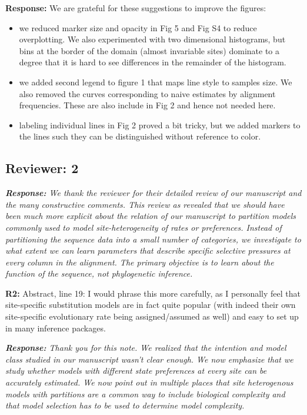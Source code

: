 \documentclass[aps,rmp,onecolumn]{revtex4-1}
\newcommand{\refb}[1]{\textbf{R2:} #1}
\newcommand{\response}[1]{{\it {\color{response}\textbf{Response:} #1}}}
\begin{document}
\response{
We are grateful for these suggestions to improve the figures:
\begin{itemize}
    \item we reduced marker size and opacity in Fig 5 and Fig S4 to reduce overplotting. We also experimented with two dimensional histograms, but bins at the border of the domain (almost invariable sites) dominate to a degree that it is hard to see differences in the remainder of the histogram.
    \item we added second legend to figure 1 that maps line style to samples size. We also removed the curves corresponding to naive estimates by alignment frequencies. These are also include in Fig 2 and hence not needed here.
    \item labeling individual lines in Fig 2 proved a bit tricky, but we added markers to the lines such they can be distinguished without reference to color.
\end{itemize}
}


\subsection*{Reviewer: 2}
\response{
We thank the reviewer for their detailed review of our manuscript and the many constructive comments.
This review as revealed that we should have been much more explicit about the relation of our manuscript to partition models commonly used to model site-heterogeneity of rates or preferences.
Instead of partitioning the sequence data into a small number of categories, we investigate to what extent we can learn parameters that describe specific selective pressures at every column in the alignment.
The primary objective is to learn about the function of the sequence, not phylogenetic inference.
}

\refb{Abstract, line 19: I would phrase this more carefully, as I personally feel that site-specific substitution models are in fact quite popular (with indeed their own site-specific evolutionary rate being assigned/assumed as well) and easy to set up in many inference packages.}

\response{Thank you for this note. We realized that the intention and model class studied in our manuscript wasn't clear enough. We now emphasize that we study whether models with different state preferences at every site can be accurately estimated.
We now point out in multiple places that site heterogenous models with partitions are a common way to include biological complexity and that model selection has to be used to determine model complexity.
}
\end{document}
